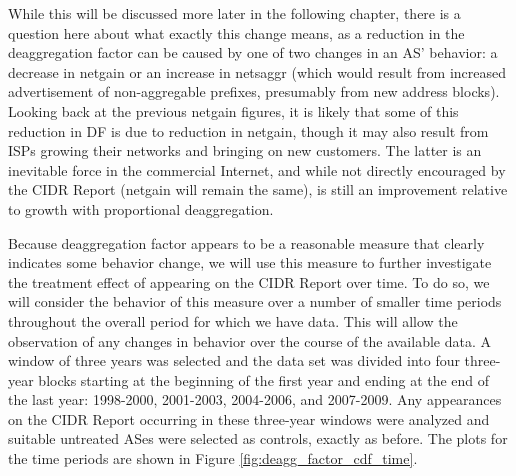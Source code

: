 While this will be discussed more later in the following chapter, there is a
question here about what exactly this change means, as a reduction in the
deaggregation factor can be caused by one of two changes in an AS' behavior: a
decrease in netgain or an increase in netsaggr (which would result from
increased advertisement of non-aggregable prefixes, presumably from new address
blocks). Looking back at the previous netgain figures, it is likely that some
of this reduction in DF is due to reduction in netgain, though it may also
result from ISPs growing their networks and bringing on new customers. The
latter is an inevitable force in the commercial Internet, and while not
directly encouraged by the CIDR Report (netgain will remain the same), is still
an improvement relative to growth with proportional deaggregation.


Because deaggregation factor appears to be a reasonable measure that clearly
indicates some behavior change, we will use this measure to further investigate
the treatment effect of appearing on the CIDR Report over time. To do so, we
will consider the behavior of this measure over a number of smaller time
periods throughout the overall period for which we have data. This will allow
the observation of any changes in behavior over the course of the available
data. A window of three years was selected and the data set was divided into
four three-year blocks starting at the beginning of the first year and ending
at the end of the last year: 1998-2000, 2001-2003, 2004-2006, and 2007-2009.
Any appearances on the CIDR Report occurring in these three-year windows were
analyzed and suitable untreated ASes were selected as controls, exactly as
before. The plots for the time periods are shown in Figure
\ref{fig:deagg_factor_cdf_time}.

